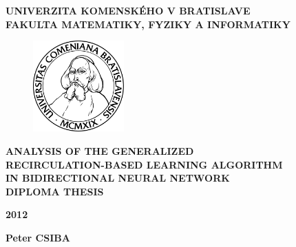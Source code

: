 \begin{center}
    \large{
        \textbf{
            UNIVERZITA KOMENSKÉHO V BRATISLAVE \\ 
            FAKULTA MATEMATIKY, FYZIKY A INFORMATIKY
        }
    }
\end{center}

\vspace{2cm}

\begin{figure}[!h]
    \centering
    \includegraphics[width=3.5cm]{img/komlogo-new}
\end{figure}

\vspace{1cm}

\begin{center}
    \large{
        \textbf{
            ANALYSIS OF THE GENERALIZED \\
            RECIRCULATION-BASED LEARNING ALGORITHM \\
            IN BIDIRECTIONAL NEURAL NETWORK \\
            \vspace{3cm}
            DIPLOMA THESIS
        }
    }
\end{center}

\vfill

\begin{multicols}{2}
    \begin{flushleft}
        \textbf{2012}
    \end{flushleft}
    \begin{flushright}
        \textbf{Peter CSIBA}
    \end{flushright}
\end{multicols}
